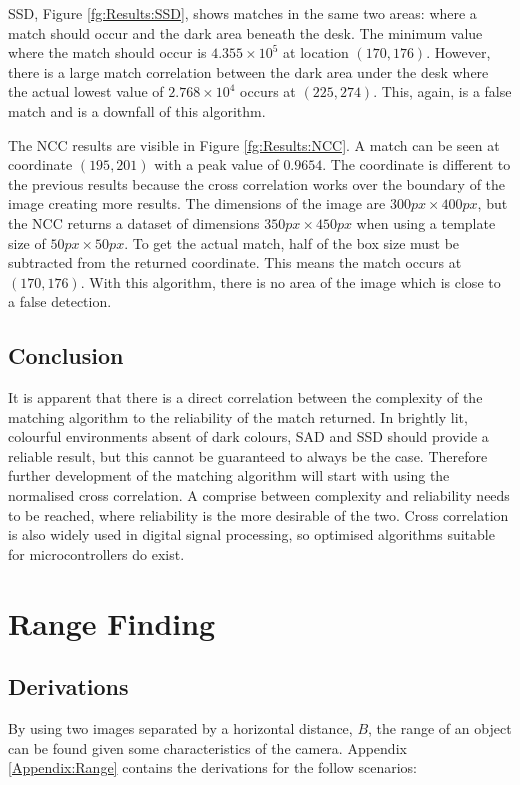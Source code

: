 SSD, Figure \ref{fg:Results:SSD}, shows matches in the same two areas: where a match should occur and the dark area beneath the desk. The minimum value where the match should occur is $4.355 \times 10^5$ at location $(170,176)$. However, there is a large match correlation between the dark area under the desk where the actual lowest value of $2.768\times10^4$ occurs at $(225,274)$. This, again, is a false match and is a downfall of this algorithm.

The NCC results are visible in Figure \ref{fg:Results:NCC}. A match can be seen at coordinate $(195,201)$ with a peak value of $0.9654$. The coordinate is different to the previous results because the cross correlation works over the boundary of the image creating more results. The dimensions of the image are $300px \times 400px$, but the NCC returns a dataset of dimensions $350px \times 450px$ when using a template size of $50px\times 50px$. To get the actual match, half of the box size must be subtracted from the returned coordinate. This means the match occurs at $(170,176)$. With this algorithm, there is no area of the image which is close to a false detection. 

\subsection{Conclusion}
It is apparent that there is a direct correlation between the complexity of the matching algorithm to the reliability of the match returned. In brightly lit, colourful environments absent of dark colours, SAD and SSD should provide a reliable result, but this cannot be guaranteed to always be the case. Therefore further development of the matching algorithm will start with using the normalised cross correlation. A comprise between complexity and reliability needs to be reached, where reliability is the more desirable of the two. Cross correlation is also widely used in digital signal processing, so optimised algorithms suitable for microcontrollers do exist.

\section{Range Finding}
\subsection{Derivations}

By using two images separated by a horizontal distance, $B$, the range of an object can be found given some characteristics of the camera. Appendix \ref{Appendix:Range} contains the derivations for the follow scenarios:

